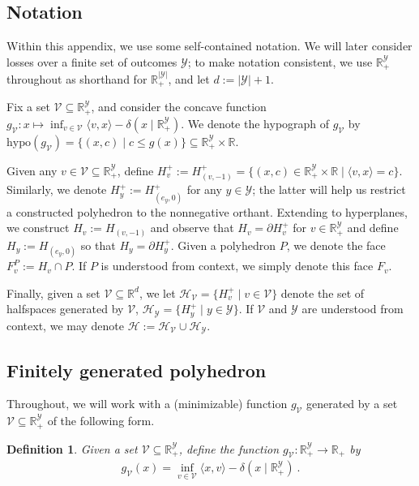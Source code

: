\documentclass[11pt]{article}
\newcommand{\reals}{\mathbb{R}}
\renewcommand{\H}{\mathcal{H}}
\newcommand{\V}{\mathcal{V}}
\newcommand{\Y}{\mathcal{Y}}
\newcommand{\inprod}[2]{\langle #1, #2 \rangle}%
\newcommand{\hyp}{\mathrm{hypo}}
\newtheorem{definition}{Definition}
\begin{document}
\subsection{Notation}\label{appsubsec:notation}
Within this appendix, we use some self-contained notation.
We will later consider losses over a finite set of outcomes $\Y$; to make notation consistent, we use $\reals^\Y_+$ throughout as shorthand for $\reals^{|\Y|}_+$, and let $d := |\Y|+1$.

Fix a set $\V \subseteq \reals^\Y_+$, and consider the concave function $g_\V : x \mapsto \inf_{v \in \V}\inprod{v}{x} - \delta(x \mid \reals^\Y_+)$.
We denote the hypograph of $g_\V$ by $\hyp(g_\V) = \{(x,c) \mid c \leq g(x)\} \subseteq \reals^\Y_+ \times \reals$.

Given any $v \in \V \subseteq \reals^\Y_+$, define $H^+_v := H^+_{(v, -1)} = \{(x, c) \in \reals^{\Y}_+ \times \reals \mid \inprod{v}{x} = c\}$.
Similarly, we denote $H_y^+ := H_{(e_y, 0)}^+$ for any $y \in \Y$; the latter will help us restrict a constructed polyhedron to the nonnegative orthant. 
Extending to hyperplanes, we construct $H_v := H_{(v,-1)}$ and observe that $H_v = \partial H^+_v$ for $v \in \reals^\Y_+$ and define $H_y := H_{(e_y, 0)}$ so that $H_y = \partial H^+_y$.
Given a polyhedron $P$, we denote the face $F^P_v := H_v \cap P$.
If $P$ is understood from context, we simply denote this face $F_v$. 

Finally, given a set $\V \subseteq \reals^d$, we let $\H_{\V} = \{H_v^+ \mid v\in\V\}$ denote the set of halfspaces generated by $\V$, $\H_\Y = \{H_y^+ \mid y\in\Y\}$.
If $\V$ and $\Y$ are understood from context, we may denote $\H := \H_\V \cup\H_\Y$.


\subsection{Finitely generated polyhedron}\label{appsubsec:phase1}
Throughout, we will work with a (minimizable) function $g_\V$ generated by a set $\V \subseteq \reals^\Y_+$ of the following form.

\begin{definition}\label{def:g-finite}
  Given a set $\V \subseteq \reals^\Y_+$, define the function $g_\V : \reals_+^\Y \to \reals_+$ by
  \begin{align*}
    g_\V(x) = \inf_{v\in\V} \inprod{x}{v} - \delta(x \mid \reals_+^\Y)~. %
  \end{align*}
\end{definition}
\end{document}
